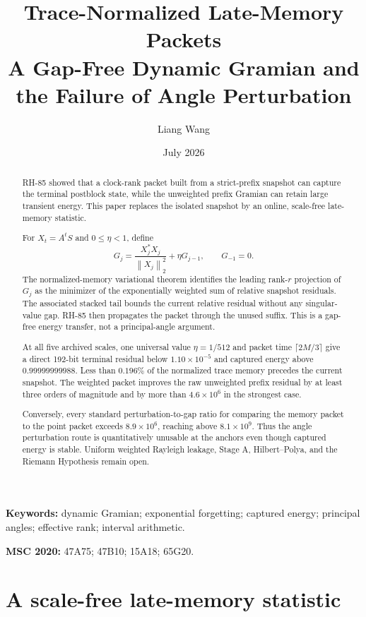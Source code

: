\documentclass[11pt]{article}
\title{Trace-Normalized Late-Memory Packets\\
\large A Gap-Free Dynamic Gramian and the Failure of Angle Perturbation}
\author{Liang Wang}
\date{July 2026}
\theoremstyle{remark}
\newcommand{\norm}[1]{\left\lVert#1\right\rVert}
\begin{document}
\maketitle

\begin{abstract}
RH-85 showed that a clock-rank packet built from a strict-prefix snapshot can
capture the terminal postblock state, while the unweighted prefix Gramian can
retain large transient energy.  This paper replaces the isolated snapshot by
an online, scale-free late-memory statistic.

For $X_t=A^tS$ and $0\le\eta<1$, define
\[
 G_j=\frac{X_j^*X_j}{\norm{X_j}_2^2}+\eta G_{j-1},\qquad G_{-1}=0.
\]
The normalized-memory variational theorem identifies the leading rank-$r$
projection of $G_j$ as the minimizer of the exponentially weighted sum of
relative snapshot residuals.  The associated stacked tail bounds the current
relative residual without any singular-value gap.  RH-85 then propagates the
packet through the unused suffix.  This is a gap-free energy transfer, not a
principal-angle argument.

At all five archived scales, one universal value $\eta=1/512$ and packet time
$\lceil2M/3\rceil$ give a direct 192-bit terminal residual below
$1.10\times10^{-5}$ and captured energy above $0.99999999988$.  Less than
$0.196\%$ of the normalized trace memory precedes the current snapshot.  The
weighted packet improves the raw unweighted prefix residual by at least three
orders of magnitude and by more than $4.6\times10^6$ in the strongest case.

Conversely, every standard perturbation-to-gap ratio for comparing the memory
packet to the point packet exceeds $8.9\times10^6$, reaching above
$8.1\times10^9$.  Thus the angle perturbation route is quantitatively unusable
at the anchors even though captured energy is stable.  Uniform weighted
Rayleigh leakage, Stage A, Hilbert--Polya, and the Riemann Hypothesis remain
open.
\end{abstract}

\noindent\textbf{Keywords:} dynamic Gramian; exponential forgetting;
captured energy; principal angles; effective rank; interval arithmetic.

\medskip
\noindent\textbf{MSC 2020:} 47A75; 47B10; 15A18; 65G20.

\section{A scale-free late-memory statistic}
\end{document}
